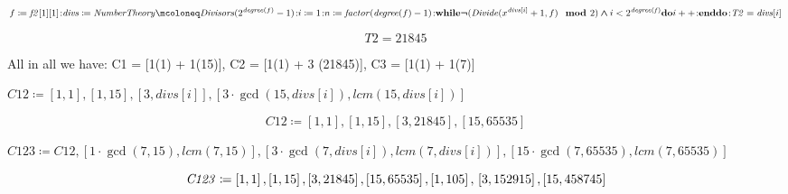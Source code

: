\documentclass{article}
\begin{document}
\begin{Maple Normal}
{$ \displaystyle f \coloneqq \mathit{f2} [1][1]\colon 
\\
 \mathit{divs} \coloneqq \mathit{NumberTheory} \mcoloneq \mathit{Divisors} (2^{\mathit{degree} (f)}-1)\colon 
\\
 i \coloneqq 1\colon 
\\
 n \coloneqq \mathit{factor} (\mathit{degree} (f)-1)\colon 
\\
 
\\
 \boldsymbol{\mathrm{while}}\boldsymbol{\neg}(\mathit{Divide} (x^{\mathit{divs} [i]}+1,f)\boldsymbol{\mod}2)\boldsymbol{\land}i <2^{\mathit{degree} \mathit{(f)}}\boldsymbol{\mathrm{do}}
\\
 i ++\colon 
\\
 \boldsymbol{\mathrm{end}}\boldsymbol{\mathrm{do}}\colon 
\\
 \mathit{T2} =\mathit{divs} [i] $}
\end{Maple Normal}
\begin{dmath}\label{(7)}
\mathit{T2} =21845
\end{dmath}
\begin{Maple Normal}
All in all we have: C1 = [1(1) + 1(15)], C2 = [1(1) + 3 (21845)], C3 = [1(1) + 1(7)]
\end{Maple Normal}
\begin{Maple Normal}
{$ \displaystyle \mathit{C12} \coloneqq [1,1],[1,15],[3,\mathit{divs} [i]],[3\cdot \gcd (15,\mathit{divs} [i]),\mathit{lcm} (15,\mathit{divs} [i])] $}
\end{Maple Normal}
\begin{dmath}\label{(8)}
\mathit{C12} \coloneqq \left[1,1\right],\left[1,15\right],\left[3,21845\right],\left[15,65535\right]
\end{dmath}
\begin{Maple Normal}
{$ \displaystyle \mathit{C123} \coloneqq \mathit{C12} ,[1\cdot \gcd (7,15),\mathit{lcm} (7,15)],[3\cdot \gcd (7,\mathit{divs} [i]),\mathit{lcm} (7,\mathit{divs} [i])],[15\cdot \gcd (7,65535),\mathit{lcm} (7,65535)] $}
\end{Maple Normal}
\begin{dmath}\label{(9)}
\mathit{C123} \coloneqq \left[1,1\right],\left[1,15\right],\left[3,21845\right],\left[15,65535\right],\left[1,105\right],
\\
\left[3,152915\right],\left[15,458745\right]
\end{dmath}
\begin{Maple Normal}

\end{Maple Normal}
\end{document}
